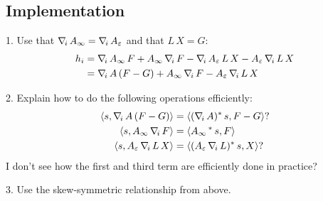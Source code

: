 \subsection{Implementation}
1. Use that $\nabla_{\!i}\, A_\infty=\nabla_{\!i}\, A_\varepsilon$ and that $L \, X=G$:
\begin{alignat*}{1}
h_i &= \nabla_{\!i}\, A_\infty \, F +  A_\infty \, \nabla_{\!i}\, F - \nabla_{\!i}\, A_\varepsilon \, L \, X -  A_\varepsilon \, \nabla_{\!i}\, L \, X\\
&= \nabla_{\!i}\, A \, (F-  G) +  A_\infty \, \nabla_{\!i}\, F  -  A_\varepsilon \, \nabla_{\!i}\, L \, X
\end{alignat*}

2. Explain how to do the following operations efficiently:
\begin{alignat*}{3}
\langle s, \nabla_{\!i}\, A \, (F-  G) \rangle &= \langle (\nabla_{\!i}\, A)^* \, s,  F-  G \rangle ? \\
\langle s, A_\infty \, \nabla_{\!i}\, F \rangle &= \langle A_\infty \,^* \, s,  F \rangle \\
\langle s, A_\varepsilon \, \nabla_{\!i}\, L \, X \rangle &= \langle (A_\varepsilon\, \nabla_{\!i}\, L)^* \, s,  X \rangle ?
\end{alignat*}
I don't see how the first and third term are efficiently done in practice?

3. Use the skew-symmetric relationship from above.
